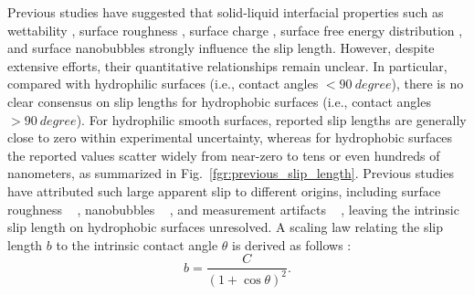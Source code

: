 \documentclass[journal=jacsat,manuscript=article]{achemso}
\providecommand{\DIFadd}[1]{{\protect\color{blue}#1}} %
\providecommand{\DIFaddbegin}{} %
\providecommand{\DIFaddend}{} %
\newcommand{\DIFaddincludegraphics}[2][]{{\color{blue}\DIFOincludegraphics[#1]{#2}}} %
\DeclareRobustCommand{\DIFaddbegin}{\DIFOaddbegin \let\includegraphics\DIFaddincludegraphics} %
\DeclareRobustCommand{\DIFaddend}{\DIFOaddend \let\includegraphics\DIFOincludegraphics} %
\begin{document}
Previous studies have suggested that solid-liquid interfacial properties such as wettability \cite{Huang2008-xu}, surface roughness \cite{Vinogradova2006-cw}, surface charge \cite{Xie2020-as}, surface free energy distribution \cite{Tocci2014-es}, and surface nanobubbles \cite{Li2016-ly} strongly influence the slip length. However, despite extensive efforts, their quantitative relationships remain unclear. In particular, compared with hydrophilic surfaces (i.e., contact angles \(< \SI{90}{degree}\)), there is no clear consensus on slip lengths for hydrophobic surfaces (i.e., contact angles \(> \SI{90}{degree}\)). \DIFaddbegin \DIFadd{For hydrophilic smooth surfaces, reported slip lengths are generally close to zero within experimental uncertainty, whereas for hydrophobic surfaces the reported values scatter widely from near-zero to tens or even hundreds of nanometers, as summarized in Fig.~\ref{fgr:previous_slip_length}. Previous studies have attributed such large apparent slip to different origins, including surface roughness \mbox{%
\cite{Vinogradova2006-cw, Lund2012-cr}}\hskip0pt%
, nanobubbles \mbox{%
\cite{Li2016-ly}}\hskip0pt%
, and measurement artifacts \mbox{%
\cite{Pradhan2025-yl}}\hskip0pt%
, leaving the intrinsic slip length on hydrophobic surfaces unresolved. }\DIFaddend A scaling law relating the slip length \(b\) to the intrinsic contact angle \(\theta\) is derived as follows \cite{Huang2008-xu}:
\begin{equation}
  b = \frac{C}{(1 + \cos \theta)^{2}}. \label{eqn:slip length scaling}
\end{equation}
\end{document}
